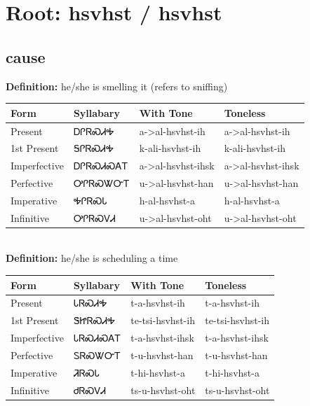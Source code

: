 \documentclass{article}%
\begin{document}
%
\normalsize%
\section*{Root: hsvhst / hsvhst}%
\subsection*{cause}%
\textbf{Definition: }%
he/she is smelling it (refers to sniffing)%
\\[0.5em]%
\begin{tabular}{|l|l|l|l|}%
\hline%
\textbf{Form}&\textbf{Syllabary}&\textbf{With Tone}&\textbf{Toneless}\\%
\hline%
Present&ᎠᎵᏒᏍᏗᎭ&a{-}>al{-}hsvhst{-}ih&a{-}>al{-}hsvhst{-}ih\\%
1st Present&ᎦᎵᏒᏍᏗᎭ&k{-}ali{-}hsvhst{-}ih&k{-}ali{-}hsvhst{-}ih\\%
Imperfective&ᎠᎵᏒᏍᏗᏍᎪᎢ&a{-}>al{-}hsvhst{-}ihsk&a{-}>al{-}hsvhst{-}ihsk\\%
Perfective&ᎤᎵᏒᏍᏔᏅᎢ&u{-}>al{-}hsvhst{-}han&u{-}>al{-}hsvhst{-}han\\%
Imperative&ᎭᎵᏒᏍᏓ&h{-}al{-}hsvhst{-}a&h{-}al{-}hsvhst{-}a\\%
Infinitive&ᎤᎵᏒᏍᏙᏗ&u{-}>al{-}hsvhst{-}oht&u{-}>al{-}hsvhst{-}oht\\%
\hline%
\end{tabular}%
\\[1em]%
\textbf{Definition: }%
he/she is scheduling a time%
\\[0.5em]%
\begin{tabular}{|l|l|l|l|}%
\hline%
\textbf{Form}&\textbf{Syllabary}&\textbf{With Tone}&\textbf{Toneless}\\%
\hline%
Present&ᏓᏒᏍᏗᎭ&t{-}a{-}hsvhst{-}ih&t{-}a{-}hsvhst{-}ih\\%
1st Present&ᏕᏥᏒᏍᏗᎭ&te{-}tsi{-}hsvhst{-}ih&te{-}tsi{-}hsvhst{-}ih\\%
Imperfective&ᏓᏒᏍᏗᏍᎪᎢ&t{-}a{-}hsvhst{-}ihsk&t{-}a{-}hsvhst{-}ihsk\\%
Perfective&ᏚᏒᏍᏔᏅᎢ&t{-}u{-}hsvhst{-}han&t{-}u{-}hsvhst{-}han\\%
Imperative&ᏘᏒᏍᏓ&t{-}hi{-}hsvhst{-}a&t{-}hi{-}hsvhst{-}a\\%
Infinitive&ᏧᏒᏍᏙᏗ&ts{-}u{-}hsvhst{-}oht&ts{-}u{-}hsvhst{-}oht\\%
\hline%
\end{tabular}%
\\[1em]%
\end{document}
